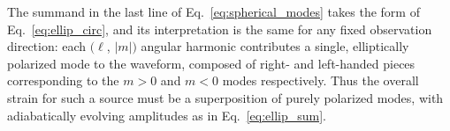 \documentclass[aps,prd,twocolumn,superscriptaddress,preprintnumbers,floatfix,nofootinbib]{revtex4-2}
\newcommand*{\eq}[1]{Eq.~\eqref{eq:#1}}
\begin{document}
% 

The summand in the last line of \eq{spherical_modes} takes the form of \eq{ellip_circ}, and its interpretation is the same for any fixed observation direction: each $(\ell$, $|m|)$ angular harmonic contributes a single, elliptically polarized mode to the waveform, composed of right- and left-handed pieces corresponding to the $m>0$ and $m<0$ modes respectively.
Thus the overall strain for such a source must be a superposition of purely polarized modes, with adiabatically evolving amplitudes as in \eq{ellip_sum}.
\end{document}
